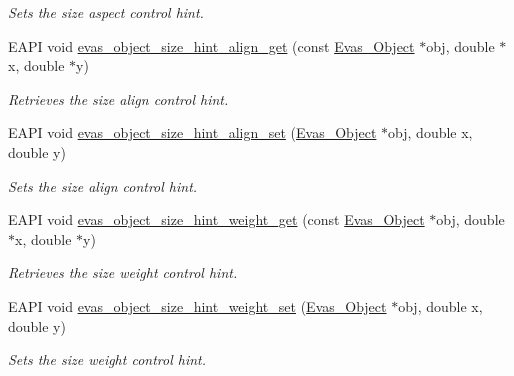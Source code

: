\begin{DoxyCompactItemize}
\begin{DoxyCompactList}\small\item\em Sets the size aspect control hint. \item\end{DoxyCompactList}\item 
EAPI void \hyperlink{group__Evas__Object__Group__Size__Hints_gaff2802d3169b29a786f9b39be3f474bb}{evas\_\-object\_\-size\_\-hint\_\-align\_\-get} (const \hyperlink{group__Evas__Object__Group_ga9e19e6dd1f517a0ba437c0114d3e7c97}{Evas\_\-Object} $\ast$obj, double $\ast$x, double $\ast$y)
\begin{DoxyCompactList}\small\item\em Retrieves the size align control hint. \item\end{DoxyCompactList}\item 
EAPI void \hyperlink{group__Evas__Object__Group__Size__Hints_ga156cf1921d0be0d7dcf4d6f93daf010f}{evas\_\-object\_\-size\_\-hint\_\-align\_\-set} (\hyperlink{group__Evas__Object__Group_ga9e19e6dd1f517a0ba437c0114d3e7c97}{Evas\_\-Object} $\ast$obj, double x, double y)
\begin{DoxyCompactList}\small\item\em Sets the size align control hint. \item\end{DoxyCompactList}\item 
EAPI void \hyperlink{group__Evas__Object__Group__Size__Hints_ga66f88dc981e7c0af05822c583e03fabb}{evas\_\-object\_\-size\_\-hint\_\-weight\_\-get} (const \hyperlink{group__Evas__Object__Group_ga9e19e6dd1f517a0ba437c0114d3e7c97}{Evas\_\-Object} $\ast$obj, double $\ast$x, double $\ast$y)
\begin{DoxyCompactList}\small\item\em Retrieves the size weight control hint. \item\end{DoxyCompactList}\item 
EAPI void \hyperlink{group__Evas__Object__Group__Size__Hints_gabb010d4e7a8772b1785185d89a1a6b98}{evas\_\-object\_\-size\_\-hint\_\-weight\_\-set} (\hyperlink{group__Evas__Object__Group_ga9e19e6dd1f517a0ba437c0114d3e7c97}{Evas\_\-Object} $\ast$obj, double x, double y)
\begin{DoxyCompactList}\small\item\em Sets the size weight control hint. \item\end{DoxyCompactList}\item 

\end{DoxyCompactItemize}

